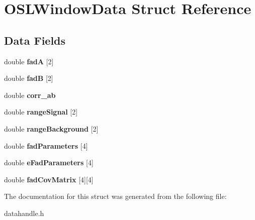 \hypertarget{structOSLWindowData}{\section{O\-S\-L\-Window\-Data Struct Reference}
\label{structOSLWindowData}
}
\subsection*{Data Fields}
\begin{DoxyCompactItemize}
\item 
\hypertarget{structOSLWindowData_a5a0e3520b1fa948ee46c5ec3b6b2c150}{double {\bfseries fad\-A} \mbox{[}2\mbox{]}}\label{structOSLWindowData_a5a0e3520b1fa948ee46c5ec3b6b2c150}

\item 
\hypertarget{structOSLWindowData_a743e69ac7391e00c025da18f95e28045}{double {\bfseries fad\-B} \mbox{[}2\mbox{]}}\label{structOSLWindowData_a743e69ac7391e00c025da18f95e28045}

\item 
\hypertarget{structOSLWindowData_a29d2f3c9b61d6beae0d7c5a39b2786a1}{double {\bfseries corr\-\_\-ab}}\label{structOSLWindowData_a29d2f3c9b61d6beae0d7c5a39b2786a1}

\item 
\hypertarget{structOSLWindowData_aa63f7ab09020a7ccb1f86b9eada15408}{double {\bfseries range\-Signal} \mbox{[}2\mbox{]}}\label{structOSLWindowData_aa63f7ab09020a7ccb1f86b9eada15408}

\item 
\hypertarget{structOSLWindowData_ab6678a09f9b6c98fb205c50831105257}{double {\bfseries range\-Background} \mbox{[}2\mbox{]}}\label{structOSLWindowData_ab6678a09f9b6c98fb205c50831105257}

\item 
\hypertarget{structOSLWindowData_a88552e8cf36dfa2bf01545be25c8a7ec}{double {\bfseries fad\-Parameters} \mbox{[}4\mbox{]}}\label{structOSLWindowData_a88552e8cf36dfa2bf01545be25c8a7ec}

\item 
\hypertarget{structOSLWindowData_a0e489ba984c5372cde7c04dffdfa77c8}{double {\bfseries e\-Fad\-Parameters} \mbox{[}4\mbox{]}}\label{structOSLWindowData_a0e489ba984c5372cde7c04dffdfa77c8}

\item 
\hypertarget{structOSLWindowData_ab4d8765df5ffae0df24a02072577e856}{double {\bfseries fad\-Cov\-Matrix} \mbox{[}4\mbox{]}\mbox{[}4\mbox{]}}\label{structOSLWindowData_ab4d8765df5ffae0df24a02072577e856}

\end{DoxyCompactItemize}


The documentation for this struct was generated from the following file\-:\begin{DoxyCompactItemize}
\item 
datahandle.\-h\end{DoxyCompactItemize}
